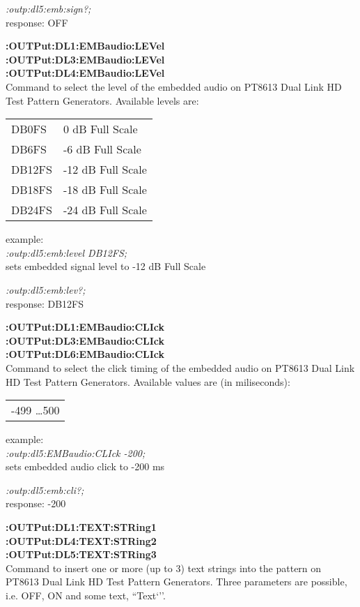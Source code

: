 \textit{:outp:dl5:emb:sign?;}\\
response: OFF

\textbf{:OUTPut:DL1:EMBaudio:LEVel}\\
\textbf{:OUTPut:DL3:EMBaudio:LEVel}\\
\textbf{:OUTPut:DL4:EMBaudio:LEVel}\\
Command to select the level of the embedded audio on PT8613 Dual Link HD Test Pattern Generators.  Available levels are:

\begin{tabular}{l l}
DB0FS  &    0 dB Full Scale\\
DB6FS  &   -6 dB Full Scale\\
DB12FS &  -12 dB Full Scale \\
DB18FS &  -18 dB Full Scale \\
DB24FS &  -24 dB Full Scale \\
\end{tabular}

example:\\
\textit{:outp:dl5:emb:level DB12FS;}\\
sets embedded signal level to -12 dB Full Scale

\textit{:outp:dl5:emb:lev?;}\\
response: DB12FS

\textbf{:OUTPut:DL1:EMBaudio:CLIck}\\
\textbf{:OUTPut:DL3:EMBaudio:CLIck}\\
\textbf{:OUTPut:DL6:EMBaudio:CLIck}\\
Command to select the click timing of the embedded audio on PT8613 Dual Link HD Test Pattern Generators.  Available values are (in miliseconds):

\begin{tabular}{l}
-499 \ldots 500\\
\end{tabular}

example:\\
\textit{:outp:dl5:EMBaudio:CLIck -200;}\\
sets embedded audio click to -200 ms

\textit{:outp:dl5:emb:cli?;}\\
response: -200

\textbf{:OUTPut:DL1:TEXT:STRing1}\\
\textbf{:OUTPut:DL4:TEXT:STRing2}\\
\textbf{:OUTPut:DL5:TEXT:STRing3}\\
Command to insert one or more (up to 3) text strings into the pattern on PT8613 Dual Link HD Test Pattern Generators.
Three parameters are possible, i.e. OFF, ON and some text, ``Text`''.

